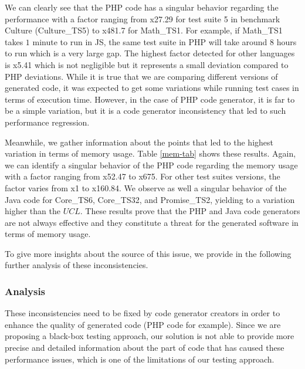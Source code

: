 We can clearly see that the PHP code has a singular behavior regarding the performance with a factor ranging from x27.29 for test suite 5 in benchmark Culture (Culture\_TS5) to x481.7 for Math\_TS1. For example, if Math\_TS1 takes $1$ minute to run in JS, the same test suite in PHP will take around $8$ hours to run which is a very large gap. 
The highest factor detected for other languages is x5.41 which is not negligible but it represents a small deviation compared to PHP deviations. While it is true that we are comparing different versions of generated code, it was expected to get some variations while running test cases in terms of execution time. However, in the case of PHP code generator, it is far to be a simple variation, but it is a code generator inconsistency that led to such performance regression.


Meanwhile, we gather information about the points that led to the highest variation in terms of memory usage. Table \ref{mem-tab} shows these results. 
Again, we can identify a singular behavior of the PHP code regarding the memory usage with a factor ranging from x52.47 to x675. For other test suites versions, the factor varies from x1 to x160.84. We observe as well a singular behavior of the Java code for Core\_TS6, Core\_TS32, and Promise\_TS2, yielding to a variation higher than the $UCL$. 
These results prove that the PHP and Java code generators are not always effective and they constitute a threat for the generated software in terms of memory usage.


To give more insights about the source of this issue, we provide in the following further analysis of these inconsistencies.



\subsubsection{Analysis}


These inconsistencies need to be fixed by code generator creators in order to enhance the quality of generated code (PHP code for example). Since we are proposing a black-box testing approach, our solution is not able to provide more precise and detailed information about the part of code that has caused these performance issues, which is one of the limitations of our testing approach.

